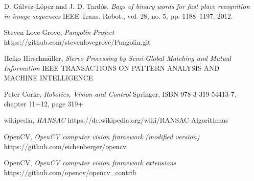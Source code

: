 \documentclass[11pt,a4paper,titlepage,oneside]{report}
\begin{document}
\begin{thebibliography}{1}
	D. Gálvez-López and J. D. Tardós,
	\textit{Bags of binary words for fast place recognition in image sequences}
	IEEE Trans. Robot., vol. 28, no. 5, pp. 1188–1197, 2012.

	Steven Love Grove,
	\textit{Pangolin Project}
	https://github.com/stevenlovegrove/Pangolin.git

	Heiko Hirschmüller,
	\textit{ Stereo Processing by Semi-Global Matching and Mutual Information}
	IEEE TRANSACTIONS ON PATTERN ANALYSIS AND MACHINE INTELLIGENCE
	 
	Peter Corke,
	\textit{Robotics, Vision and Control}
	Springer, ISBN 978-3-319-54413-7, chapter 11+12, page 319+

	wikipedia,
	\textit{RANSAC}
	https://de.wikipedia.org/wiki/RANSAC-Algorithmus

	OpenCV,
	\textit{OpenCV computer vision framework (modified version)}
	https://github.com/eichenberger/opencv

	OpenCV,
	\textit{OpenCV computer vision framework extensions}
	https://github.com/opencv/opencv\_contrib

\end{thebibliography}
\end{document}

